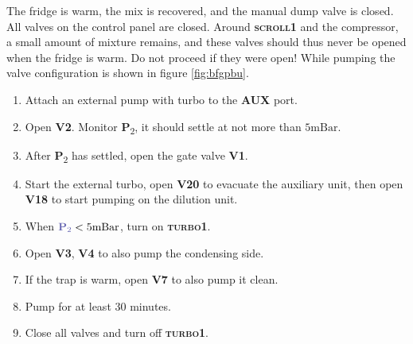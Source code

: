 \documentclass{article}[18pt,A4]
\newcommand{\mBar}{\mathrm{mBar}}
\newcommand{\thing}[1]{{\color{gray}\textsc{ \textbf{#1}}}}
\newcommand{\valve}[1]{{\color{gray}\textbf{V#1}}}
\newcommand{\pressure}[1]{{\color{pressurecolor}\textbf{P}\textsubscript{#1}}}
\begin{document}
The fridge is warm, the mix is recovered, and the manual dump valve is closed.
All valves on the control panel are closed.
Around \thing{scroll1} and the compressor, a small amount of mixture remains, and these valves should thus never be opened when the fridge is warm.
Do not proceed if they were open! While pumping the valve configuration is shown in figure  \ref{fig:bfgpbu}. 
\begin{enumerate}
    \item Attach an external pump with turbo to the \thing{AUX} port.
    \item Open \valve{2}. Monitor \pressure{2}, it should settle at not more than $5 \mBar$.
    \item After \pressure{2} has settled, open the gate valve \valve{1}.
    \item Start the external turbo, open \valve{20} to evacuate the auxiliary unit, then open \valve{18} to start pumping on the dilution unit.
    \item When $\pressure{2} < 5 \mBar$, turn on \thing{turbo1}.
    \item Open \valve{3}, \valve{4} to also pump the condensing side.
    \item If the trap is warm, open \valve{7} to also pump it clean.
    \item Pump for at least 30 minutes.
    \item Close all valves and turn off \thing{turbo1}.
\end{enumerate}

\newpage
\end{document}

